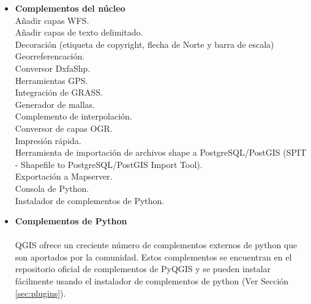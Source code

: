 \begin{itemize}
\item \textbf{Complementos del núcleo}
\\ Añadir capas WFS.
\\ Añadir capas de texto delimitado.
\\ Decoración (etiqueta de copyright, flecha de Norte y barra de escala)
\\ Georreferencación.
\\ Conversor DxfaShp.
\\ Herramientas GPS.
\\ Integración de GRASS.
\\ Generador de mallas.
\\ Complemento de interpolación.
\\ Conversor de capas OGR.
\\ Impresión rápida.
\\ Herramienta de importación de archivos shape a PostgreSQL/PostGIS (SPIT - Shapefile to PostgreSQL/PostGIS Import Tool).
\\ Exportación a Mapserver.
\\ Consola de Python.
\\ Instalador de complementos de Python.
\\ \item \textbf{Complementos de Python}
\\ \\ QGIS ofrece un creciente número de complementos externos de python que son aportados 
por la comunidad. Estos complementos se encuentran en el repositorio oficial
de complementos de PyQGIS y se pueden instalar fácilmente usando el instalador de 
complementos de python (Ver Sección \ref{sec:plugins}).
\end{itemize}

